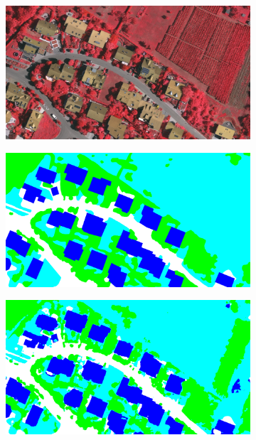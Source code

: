 \begin{figure}[htb]
 \begin{subfigure}{0.24\textwidth}
   \centering
   \includegraphics[width=1\linewidth]{fig/vai/17.JPG}
 \end{subfigure}\vspace{1mm}
 \begin{subfigure}{0.24\textwidth}
   \centering
   \includegraphics[width=1\linewidth]{fig/vai/17_gt.png}
 \end{subfigure}
 \begin{subfigure}{0.24\textwidth}
   \centering
   \includegraphics[width=1\linewidth]{fig/vai/17_manual.png}

\end{subfigure}
\end{figure}
